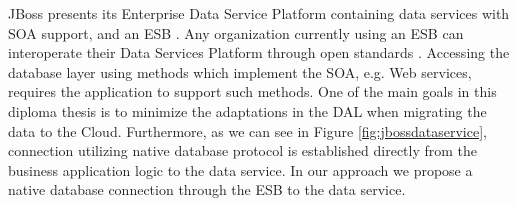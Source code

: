 JBoss presents its Enterprise Data Service Platform containing data services with \ac{SOA} support, and an \ac{ESB} \cite{jboss2011}. Any organization currently using an \ac{ESB} can interoperate their Data Services Platform through open standards \cite{jboss2011}. Accessing the database layer using methods which implement the \ac{SOA}, e.g. Web services, requires the application to support such methods. One of the main goals in this diploma thesis is to minimize the adaptations in the DAL when migrating the data to the Cloud. Furthermore, as we can see in Figure \ref{fig:jbossdataservice}, connection utilizing native database protocol is established directly from the business application logic to the data service. In our approach we propose a native database connection through the \ac{ESB} to the data service. 